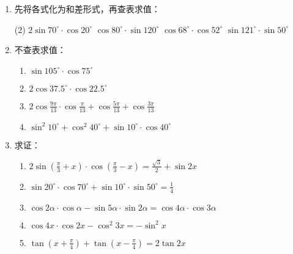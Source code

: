 \begin{ex}
\begin{enumerate}
    \item 先将各式化为和差形式，再查表求值：
\begin{tasks}(2)
    \task $2\sin70^{\circ}\cdot \cos20^{\circ}$
    \task $\cos80^{\circ}\cdot \sin120^{\circ}$
    \task $\cos68^{\circ}\cdot \cos52^{\circ}$
    \task $\sin121^{\circ}\cdot \sin50^{\circ}$
\end{tasks}          

    
    \item 不查表求值：
    \begin{enumerate}
        \item $\sin105^{\circ}\cdot \cos75^{\circ}$
        \item $2\cos37.5^{\circ}\cdot \cos22.5^{\circ}$
        \item $2\cos\frac{9\pi}{13}\cdot \cos\frac{\pi}{13}+\cos\frac{5\pi}{13}+\cos\frac{3\pi}{13}$
        \item $\sin^2 10^{\circ}+\cos^2 40^{\circ}+\sin 10^{\circ}\cdot \cos40^{\circ}$
    \end{enumerate} 
    
    \item 求证：
    \begin{enumerate}
        \item $2\sin\left(\frac{\pi}{3}+x\right)\cdot \cos\left(\frac{\pi}{3}-x\right)=\frac{\sqrt{3}}{2}+\sin 2x$
        \item $\sin20^{\circ}\cdot \cos70^{\circ}+\sin10^{\circ}\cdot \sin50^{\circ}=\frac{1}{4}$
        \item $\cos2\alpha\cdot \cos\alpha-\sin5\alpha\cdot \sin2\alpha=\cos4\alpha\cdot \cos3\alpha$
        \item $\cos4x\cdot \cos2x-\cos^2 3x=-\sin^2 x$
        \item $\tan\left(x+\frac{\pi}{4}\right)+\tan\left(x-\frac{\pi}{4}\right)=2\tan 2x$
    \end{enumerate} 
\end{enumerate}  
\end{ex}

